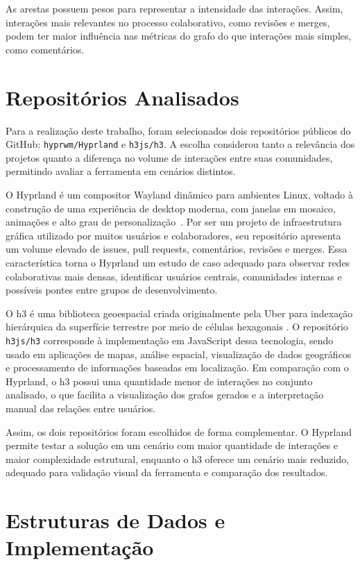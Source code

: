 \documentclass[12pt]{article}
\begin{document}
As arestas possuem pesos para representar a intensidade das interações. Assim,
interações mais relevantes no processo colaborativo, como revisões e merges,
podem ter maior influência nas métricas do grafo do que interações mais simples,
como comentários.

\section{Repositórios Analisados}

Para a realização deste trabalho, foram selecionados dois repositórios públicos
do GitHub: \texttt{hyprwm/Hyprland} e \texttt{h3js/h3}. A escolha considerou
tanto a relevância dos projetos quanto a diferença no volume de interações
entre suas comunidades, permitindo avaliar a ferramenta em cenários distintos.

O Hyprland é um compositor Wayland dinâmico para ambientes Linux, voltado à
construção de uma experiência de desktop moderna, com janelas em mosaico,
animações e alto grau de personalização~\cite{hyprlandDocs}. Por ser um projeto
de infraestrutura gráfica utilizado por muitos usuários e colaboradores, seu
repositório apresenta um volume elevado de issues, pull requests, comentários,
revisões e merges. Essa característica torna o Hyprland um estudo de caso
adequado para observar redes colaborativas mais densas, identificar usuários
centrais, comunidades internas e possíveis pontes entre grupos de
desenvolvimento.

O h3 é uma biblioteca geoespacial criada originalmente pela Uber para indexação
hierárquica da superfície terrestre por meio de células hexagonais
\cite{h3Docs}. O repositório \texttt{h3js/h3} corresponde à implementação em
JavaScript dessa tecnologia, sendo usado em aplicações de mapas, análise
espacial, visualização de dados geográficos e processamento de informações
baseadas em localização. Em comparação com o Hyprland, o h3 possui uma
quantidade menor de interações no conjunto analisado, o que facilita a
visualização dos grafos gerados e a interpretação manual das relações entre
usuários.

Assim, os dois repositórios foram escolhidos de forma complementar. O Hyprland
permite testar a solução em um cenário com maior quantidade de interações e
maior complexidade estrutural, enquanto o h3 oferece um cenário mais reduzido,
adequado para validação visual da ferramenta e comparação dos resultados.

\section{Estruturas de Dados e Implementação}
\end{document}
